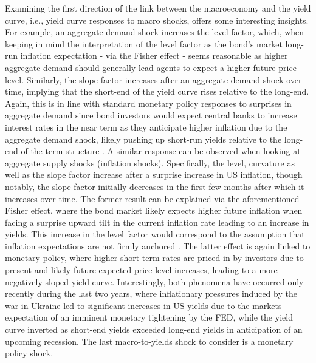 Examining the first direction of the link between the macroeconomy and the yield curve, i.e., yield curve responses to macro shocks, offers some interesting insights. 
For example, an aggregate demand shock increases the level factor, which, when keeping in mind the interpretation 
of the level factor as the bond's market long-run inflation expectation - via the Fisher effect - seems reasonable as higher aggregate demand should generally lead agents to expect a higher future price level.
Similarly, the slope factor increases after an aggregate demand shock over time, implying that the short-end of the yield curve rises relative to the long-end. 
Again, this is in line with standard monetary policy responses to surprises in aggregate demand since bond investors would expect central banks to increase interest rates in the near term as they anticipate higher inflation due to the aggregate demand shock, likely pushing up short-run yields relative to the long-end of the term structure \citep{diebold2006macroeconomy}.
A similar response can be observed when looking at aggregate supply shocks (inflation shocks).
Specifically, the level, curvature as well as the slope factor increase after a surprise increase in US inflation, though notably, the slope factor initially decreases in the first few months after which it increases over time. 
The former result can be explained via the aforementioned Fisher effect, where the bond market likely expects higher future inflation when facing a surprise upward tilt in the current inflation rate leading to an increase in yields. 
This increase in the level factor would correspond to the assumption that inflation expectations are not firmly anchored \citep{diebold2006macroeconomy}. 
The latter effect is again linked to monetary policy, where higher short-term rates are priced in by investors due to present and likely future expected price level increases, leading to a more negatively sloped yield curve. 
Interestingly, both phenomena have occurred only recently during the last two years, where inflationary pressures induced by the war in Ukraine led to significant increases in US yields due to the markets expectation of an imminent monetary tightening by the FED, while the yield curve inverted as short-end yields exceeded long-end yields in anticipation of an upcoming recession. 
The last macro-to-yields shock to consider is a monetary policy shock. 
